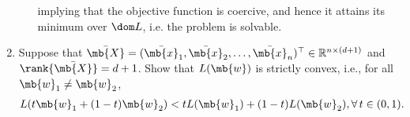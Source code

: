 \begin{exercise}
\begin{enumerate}
\begin{solution}
\begin{enumerate}
                        implying that the objective function is coercive\cite{beckFirstOrderMethodsOptimization2017}, and hence it attains its minimum over $\dom L$, i.e. the problem is solvable.
                        \qedhere
                \end{enumerate}
            \end{solution}
        \item  Suppose that $\bar{\mb{X}}=(\bar{\mb{x}}_1,\bar{\mb{x}}_2,\dots,\bar{\mb{x}}_n)^\top\in\mathbb{R}^{n \times (d+1)}$ and $\rank{\bar{\mb{X}}}=d+1$. Show that $L(\mb{w})$ is strictly convex, i.e., for all $\mb{w}_1\neq \mb{w}_2$,
            \begin{align*}
                L(t\mb{w}_1 + (1-t)\mb{w}_2) < t L(\mb{w}_1)+(1-t)L(\mb{w}_2),\forall\, t \in (0,1).
            \end{align*}


\end{enumerate}
\end{exercise}

